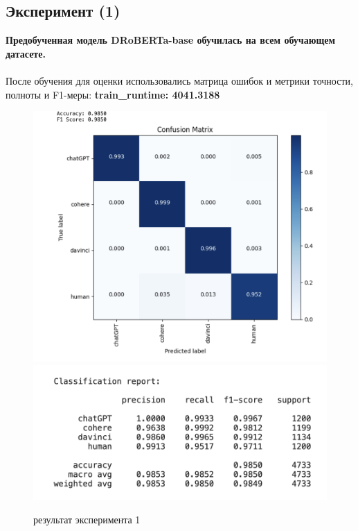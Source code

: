 \subsection{Эксперимент (1)}
\textbf{Предобученная модель DRoBERTa-base обучилась на всем обучающем датасете.}\\ \\
После обучения для оценки использовались матрица ошибок и метрики точности, полноты и F1-меры: \newline
\textbf{train\_runtime: 4041.3188}
\begin{figure}[h]
    \centering
    \includegraphics[width=.75\textwidth]{images/bert_vanilla.png}
    \includegraphics[width=.65\textwidth]{images/exp1_report.png}
    \caption{результат эксперимента 1}
    \label{fig:1}
\end{figure}


\newpage
